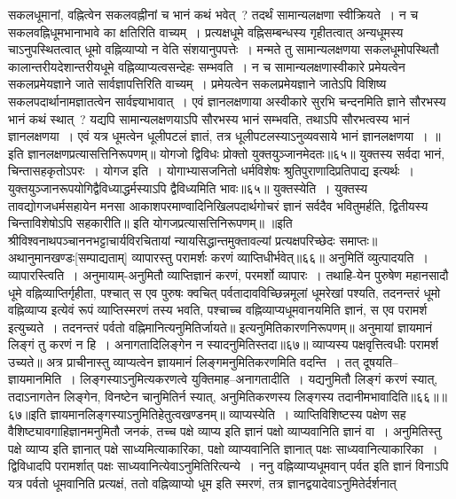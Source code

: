 सकलधूमानां, वह्नित्वेन सकलवह्नीनां च भानं कथं भवेत्~? तदर्थं सामान्यलक्षणा स्वीक्रियते~। न च सकलवह्निधूमभानाभावे का क्षतिरिति वाच्यम्~। प्रत्यक्षधूमे
वह्निसम्बन्धस्य गृहीतत्वात् अन्यधूमस्य चाऽनुपस्थितत्वात् धूमो वह्निव्याप्यो न वेति संशयानुपपत्तेः~। मन्मते तु सामान्यलक्षणया सकलधूमोपस्थितौ कालान्तरीयदेशान्तरीयधूमे
वह्निव्याप्यत्वसन्देहः सम्भवति~। न च सामान्यलक्षणास्वीकारे प्रमेयत्वेन सकलप्रमेयज्ञाने जाते सार्वज्ञापत्तिरिति वाच्यम्~। प्रमेयत्वेन सकलप्रमेयज्ञाने जातेऽपि विशिष्य
सकलपदार्थानामज्ञातत्वेन सार्वज्ञ्याभावात्~।
एवं ज्ञानलक्षणाया अस्वीकारे सुरभि चन्दनमिति ज्ञाने सौरभस्य भानं कथं स्थात्~? यद्यपि सामान्यलक्षणयाऽपि सौरभस्य भानं सम्भवति, तथाऽपि सौरभत्वस्य
भानं ज्ञानलक्षणया~। एवं यत्र धूमत्वेन धूलीपटलं ज्ञातं, तत्र धूलीपटलस्याऽनुव्यवसाये भानं ज्ञानलक्षणया~।
॥इति ज्ञानलक्षणप्रत्यासत्तिनिरूपणम्॥
योगजो द्विविधः प्रोक्तो युक्तयुञ्जानमेदतः॥६५॥
युक्तस्य सर्वदा भानं, चिन्तासहकृतोऽपरः~।
योगज इति~। योगाभ्यासजनितो धर्मविशेषः श्रुतिपुराणादिप्रतिपाद्य इत्यर्थः~। युक्तयुञ्जानरूपयोगिद्वैविध्याद्धर्मस्याऽपि द्वैविध्यमिति भावः॥६५॥
युक्तस्येति~। युक्तस्य तावद्योगजधर्मसहायेन मनसा आकाशपरमाण्वादिनिखिलपदार्थगोचरं ज्ञानं सर्वदैव भवितुमर्हति, द्वितीयस्य चिन्ताविशेषोऽपि सहकारीति॥
इति योगजप्रत्यासत्तिनिरूपणम्॥
॥इति श्रीविश्वनाथपञ्चाननभट्टाचार्यविरचितायां न्यायसिद्धान्तमुक्तावल्यां प्रत्यक्षपरिच्छेदः समाप्तः॥
अथानुमानखण्डः[सम्पाद्यताम्]
व्यापारस्तु परामर्शः करणं व्याप्तिधीर्भवेत्॥६६॥
अनुमितिं व्युत्पादयति~। व्यापारस्त्विति~। अनुमायाम्-अनुमितौ व्याप्तिज्ञानं करणं, परमर्शो व्यापारः~।
तथाहि-येन पुरुषेण महानसादौ धूमे वह्निव्याप्तिर्गृहीता, पश्चात् स एव पुरुषः क्वचित् पर्वतादावविच्छिन्नमूलां धूमरेखां पश्यति, तदनन्तरं धूमो वह्निव्याप्य
इत्येवं रूपं व्याप्तिस्मरणं तस्य भवति, पश्चाच्च वह्निव्याप्यधूमवानयमिति ज्ञानं, स एव परामर्श इत्युच्यते~। तदनन्तरं पर्वतो वह्निमानित्यनुमितिर्जायते॥
इत्यनुमितिकारणनिरूपणम्॥
अनुमायां ज्ञायमानं लिङ्गं तु करणं न हि~।
अनागतादिलिङ्गेन न स्यादनुमितिस्तदा॥६७॥
व्याप्यस्य पक्षवृत्तित्वधीः परामर्श उच्यते॥
अत्र प्राचीनास्तु व्याप्यत्वेन ज्ञायमानं लिङ्गमनुमितिकरणमिति वदन्ति~। तत् दूषयति--ज्ञायमानमिति~। लिङ्गस्याऽनुमित्यकरणत्वे युक्तिमाह--अनागतादीति~।
यद्यनुमितौ लिङ्गं करणं स्यात्, तदाऽनागतेन लिङ्गेन, विनष्टेन चानुमितिर्न स्यात्, अनुमितिकरणस्य लिङ्गस्य तदानीमभावादिति॥६६॥॥६७॥इति
ज्ञायमानलिङ्गस्याऽनुमितिहेतुत्वखण्डनम्॥
व्याप्यस्येति~। व्याप्तिविशिष्टस्य पक्षेण सह वैशिष्ट्यावगाहिज्ञानमनुमितौ जनकं, तच्च पक्षे व्याप्य इति ज्ञानं पक्षो व्याप्यवानिति ज्ञानं वा~। अनुमितिस्तु पक्षे
व्याप्य इति ज्ञानात् पक्षे साध्यमित्याकारिका, पक्षो व्याप्यवानिति ज्ञानात् पक्षः साध्यवानित्याकारिका~।
द्विविधादपि परामर्शात् पक्षः साध्यवानित्येवाऽनुमितिरित्यन्ये~।
ननु वह्निव्याप्यधूमवान् पर्वत इति ज्ञानं विनाऽपि यत्र पर्वतो धूमवानिति प्रत्यक्षं, ततो वह्निव्याप्यो धूम इति स्मरणं, तत्र ज्ञानद्वयादेवाऽनुमितेर्दर्शनात्
